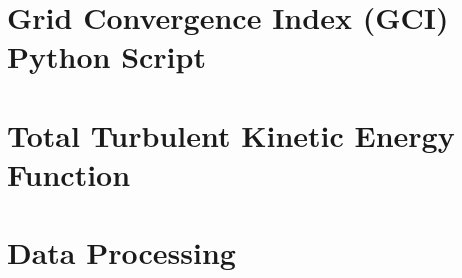 \documentclass[a4paper,12pt]{report}
\begin{document}
\begin{appendices}
\chapter{Grid Convergence Index (GCI) Python Script}
\label{chap:appendixA}

\chapter{Total Turbulent Kinetic Energy Function}
\label{chap:appendixB}

\chapter{Data Processing}
\label{chap:appendixC}

\end{appendices}
\end{document}
